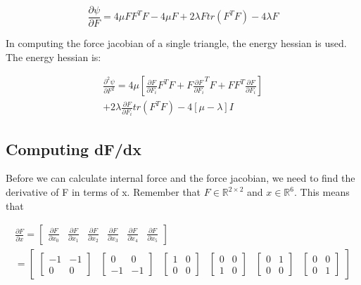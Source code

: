 \documentclass[twocolumn,10pt]{asme2ej}
\begin{document}
\begin{equation}
\frac{\partial \psi}{\partial F} = 4\mu FF^TF - 4\mu F + 2\lambda Ftr(F^TF) -4\lambda F
\label{eq_pk1}
\end{equation}

In computing the force jacobian of a single triangle, the energy hessian is used. The energy hessian is:

\begin{equation}
  \begin{split}
\frac{\partial^2 \psi}{\partial F^2} = 4\mu [\frac{\partial F}{\partial F_i}F^TF + F\frac{\partial F}{\partial F_i}^TF + FF^T\frac{\partial F}{\partial F_i}] \\ + 2\lambda \frac{\partial F}{\partial F_i}tr(F^TF) - 4[\mu -\lambda]I
  \end{split}
\label{eq_dpdf}
\end{equation}

\subsection{Computing dF/dx}

Before we can calculate internal force and the force jacobian, we need to find the derivative of F in terms of x. Remember that $F \in \mathbb{R}^{2 \times 2}$ and $x \in \mathbb{R}^6$. This means that

\begin{equation}
  \begin{split}
    \frac{\partial F}{\partial x} = \begin{bmatrix} \frac{\partial F}{\partial x_0} & \frac{\partial F}{\partial x_1}
    & \frac{\partial F}{\partial x_2} & \frac{\partial F}{\partial x_3} & \frac{\partial F}{\partial x_4}
    & \frac{\partial F}{\partial x_5} \end{bmatrix} \\
    = \begin{bmatrix} \begin{bmatrix} -1 & -1 \\ 0 & 0 \end{bmatrix} & \begin{bmatrix} 0 & 0 \\ -1 & -1 \end{bmatrix}
  & \begin{bmatrix} 1 & 0 \\ 0 & 0 \end{bmatrix} & \begin{bmatrix} 0 & 0 \\ 1 & 0 \end{bmatrix}
  & \begin{bmatrix} 0 & 1 \\ 0 & 0 \end{bmatrix} & \begin{bmatrix} 0 & 0 \\ 0 & 1 \end{bmatrix}\end{bmatrix}
  \end{split}
\label{eq_dFdx}
\end{equation}
\end{document}
